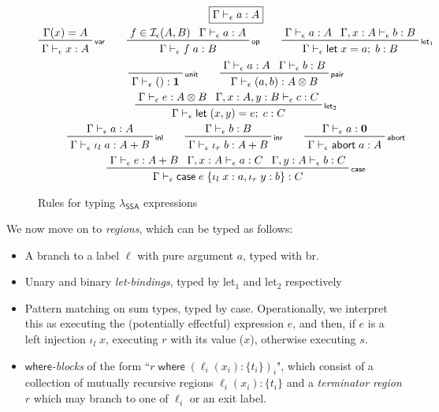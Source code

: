 \documentclass[acmsmall,screen,review]{acmart}
\newcommand{\mc}[1]{\ensuremath{\mathcal{#1}}}
\newcommand{\mb}[1]{\ensuremath{\mathbf{#1}}}
\newcommand{\ms}[1]{\ensuremath{\mathsf{#1}}}
\newcommand{\lto}{:}
\newcommand{\linl}[1]{\iota_l\;{#1}}
\newcommand{\linr}[1]{\iota_r\;{#1}}
\newcommand{\labort}[1]{\ms{abort}\;{#1}}
\newcommand{\letexpr}[3]{\ensuremath{\ms{let}\;#1 = #2;\;#3}}
\newcommand{\caseexpr}[5]{\ms{case}\;#1\;\{\linl{#2} \lto #3, \linr{#4} \lto #5\}}
\newcommand{\where}[2]{#1\;\ms{where}\;#2}
\newcommand{\wbranch}[3]{#1(#2) \lto \{#3\}}
\newcommand{\bhyp}[2]{#1 : #2}
\newcommand{\rle}[1]{{\scriptsize\textsf{#1}}}
\newcommand{\hasty}[4]{#1 \vdash_{#2} #3: {#4}}
\newcommand{\isop}[4]{#1 \in \mc{I}_{#4}(#2, #3)}
\newcommand{\brle}[1]{{\textsf{#1}}}
\newcommand{\isotopessa}{\(\lambda_{\ms{SSA}}\)}
\begin{document}
\begin{figure}
  \begin{gather*}
    \boxed{\hasty{\Gamma}{\epsilon}{a}{A}} \\
    \prftree[r]{\rle{var}}{\Gamma(x) = A}{\hasty{\Gamma}{\epsilon}{x}{A}} \qquad
    \prftree[r]{\rle{op}}{\isop{f}{A}{B}{\epsilon}}{\hasty{\Gamma}{\epsilon}{a}{A}}
      {\hasty{\Gamma}{\epsilon}{f\;a}{B}} \qquad
    \prftree[r]{\rle{let$_1$}}
      {\hasty{\Gamma}{\epsilon}{a}{A}}
      {\hasty{\Gamma, \bhyp{x}{A}}{\epsilon}{b}{B}}
      {\hasty{\Gamma}{\epsilon}{\letexpr{x}{a}{b}}{B}} \\
    \prftree[r]{\rle{unit}}{\hasty{\Gamma}{\epsilon}{()}{\mb{1}}} \qquad
    \prftree[r]{\rle{pair}}{\hasty{\Gamma}{\epsilon}{a}{A}}{\hasty{\Gamma}{\epsilon}{b}{B}}
      {\hasty{\Gamma}{\epsilon}{(a, b)}{A \otimes B}} \\
    \prftree[r]{\rle{let$_2$}}
      {\hasty{\Gamma}{\epsilon}{e}{A \otimes B}}
      {\hasty{\Gamma, \bhyp{x}{A}, \bhyp{y}{B}}{\epsilon}{c}{C}}
      {\hasty{\Gamma}{\epsilon}{\letexpr{(x, y)}{e}{c}}{C}} \\
    \prftree[r]{\rle{inl}}{\hasty{\Gamma}{\epsilon}{a}{A}}
      {\hasty{\Gamma}{\epsilon}{\linl{a}}{A + B}} \qquad
    \prftree[r]{\rle{inr}}{\hasty{\Gamma}{\epsilon}{b}{B}}
      {\hasty{\Gamma}{\epsilon}{\linr{b}}{A + B}} \qquad
    \prftree[r]{\rle{abort}}{\hasty{\Gamma}{\epsilon}{a}{\mb{0}}}
      {\hasty{\Gamma}{\epsilon}{\labort{a}}{A}} \\
    \prftree[r]{\rle{case}}
      {\hasty{\Gamma}{\epsilon}{e}{A + B}}
      {\hasty{\Gamma, \bhyp{x}{A}}{\epsilon}{a}{C}}
      {\hasty{\Gamma, \bhyp{y}{A}}{\epsilon}{b}{C}}
      {\hasty{\Gamma}{\epsilon}{\caseexpr{e}{x}{a}{y}{b}}{C}}
  \end{gather*}
  \caption{Rules for typing \isotopessa{} expressions}
  \Description{}
  \label{fig:ssa-expr-rules}
\end{figure}

We now move on to \emph{regions}, which can be typed as follows:
\begin{itemize}
  \item A branch to a label $\ell$ with pure argument $a$, typed with \brle{br}.
  
  \item Unary and binary \emph{let-bindings}, typed by \brle{let$_1$} and \brle{let$_2$}
  respectively
  
  \item Pattern matching on sum types, typed by \brle{case}. Operationally, we interpret this as
  executing the (potentially effectful) expression $e$, and then, if $e$ is a left injection
  $\iota_l\;x$, executing $r$ with its value ($x$), otherwise executing $s$.
  
  \item \emph{\ms{where}-blocks} of the form ``$\where{r}{(\wbranch{\ell_i}{x_i}{t_i})_i}$",
  which consist of a collection of mutually recursive regions $\wbranch{\ell_i}{x_i}{t_i}$ and a
  \emph{terminator region} $r$ which may branch to one of $\ell_i$ or an exit label.
\end{itemize}
\end{document}

